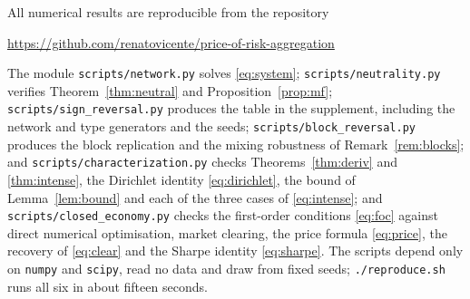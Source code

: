 All numerical results are reproducible from the repository
%
\begin{center}
\url{https://github.com/renatovicente/price-of-risk-aggregation}
\end{center}
%
The module \texttt{scripts/network.py} solves \eqref{eq:system};
\texttt{scripts/neutrality.py} verifies Theorem~\ref{thm:neutral} and
Proposition~\ref{prop:mf}; \texttt{scripts/sign\_reversal.py} produces
the table in the supplement, including the network and type generators and
the seeds; \texttt{scripts/block\_reversal.py} produces the block replication and
the mixing robustness of Remark~\ref{rem:blocks}; and
\texttt{scripts/characterization.py} checks Theorems~\ref{thm:deriv} and
\ref{thm:intense}, the Dirichlet identity \eqref{eq:dirichlet}, the bound of
Lemma~\ref{lem:bound} and each of the three cases of \eqref{eq:intense}; and
\texttt{scripts/closed\_economy.py} checks the first-order conditions
\eqref{eq:foc} against direct numerical optimisation, market clearing, the price
formula \eqref{eq:price}, the recovery of \eqref{eq:clear} and the Sharpe
identity \eqref{eq:sharpe}. The scripts depend only on
\texttt{numpy} and \texttt{scipy}, read no data and draw from fixed seeds;
\texttt{./reproduce.sh} runs all six in about fifteen seconds.

